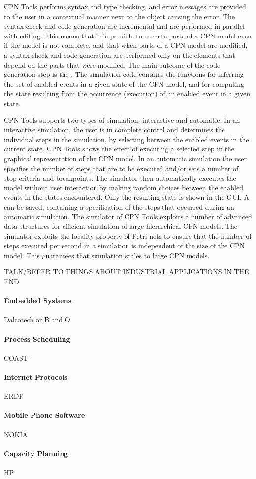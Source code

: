 
CPN Tools performs syntax and type checking, and error messages are
provided to the user in a contextual manner next to the object causing
the error. The syntax check and code generation are incremental and
are performed in parallel with editing. This means that it is possible
to execute parts of a CPN model even if the model is not complete, and
that when parts of a CPN model are modified, a syntax check and code
generation are performed only on the elements that depend on the parts
that were modified. The main outcome of the code generation step is
the . The simulation code contains the
functions for inferring the set of enabled events in a given state of
the CPN model, and for computing the state resulting from the
occurrence (execution) of an enabled event in a given state.


CPN Tools supports two types of simulation: interactive and
automatic. In an interactive simulation, the user is in complete
control and determines the individual steps in the simulation, by
selecting between the enabled events in the current state. CPN Tools
shows the effect of executing a selected step in the graphical
representation of the CPN model. In an automatic simulation the user
specifies the number of steps that are to be executed and/or sets a
number of stop criteria and breakpoints. The simulator then
automatically executes the model without user interaction by making
random choices between the enabled events in the states
encountered. Only the resulting state is shown in the GUI. A
 can be saved, containing a specification
of the steps that occurred during an automatic simulation. The
simulator of CPN Tools exploits a number of advanced data structures
for efficient simulation of large hierarchical CPN models. The
simulator exploits the locality property of Petri nets to ensure that
the number of steps executed per second in a simulation is independent
of the size of the CPN model. This guarantees that simulation scales
to large CPN models.

TALK/REFER TO THINGS ABOUT INDUSTRIAL APPLICATIONS IN THE END

\paragraph{Embedded Systems} Dalcotech or B and O

\paragraph{Process Scheduling} COAST

\paragraph{Internet Protocols} ERDP

\paragraph{Mobile Phone Software} NOKIA

\paragraph{Capacity Planning} HP

